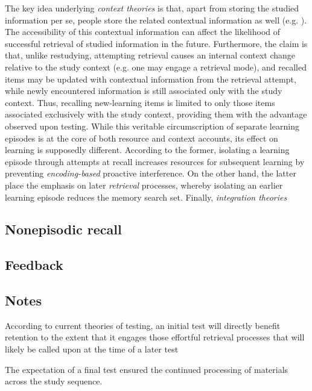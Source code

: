 \documentclass[../main.tex]{subfiles}
\begin{document}
The key idea underlying \textit{context theories} is that, apart from storing the studied information per se, people store the related contextual information as well (e.g. \citealp{lehmanEpisodicContextAccount2014}). The accessibility of this contextual information can affect the likelihood of successful retrieval of studied information in the future. Furthermore, the claim is that, unlike restudying, attempting retrieval causes an internal context change relative to the study context (e.g. one may engage a retrieval mode), and recalled items may be updated with contextual information from the retrieval attempt, while newly encountered information is still associated only with the study context. Thus, recalling new-learning items is limited to only those items associated exclusively with the study context, providing them with the advantage observed upon testing. While this veritable circumscription of separate learning episodes is at the core of both resource and context accounts, its effect on learning is supposedly different. According to the former, isolating a learning episode through attempts at recall increases resources for subsequent learning by preventing \textit{encoding-based} proactive interference. On the other hand, the latter place the emphasis on later \textit{retrieval} processes, whereby isolating an earlier learning episode reduces the memory search set. Finally, \textit{integration theories}

\subsection{Nonepisodic recall}

\subsection{Feedback}


{
    \biblio
}

\subsection{Notes}

According to current theories of testing, an initial test will directly benefit retention to the extent that it engages those effortful retrieval processes that will likely be called upon at the time of a later test \cite{roedigeriiiPowerTestingMemory2006}

The expectation of a final test ensured the
continued processing of materials across the study sequence.
\end{document}
